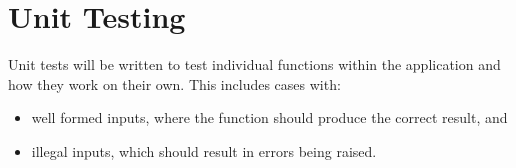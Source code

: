 \section{Unit Testing}

Unit tests will be written to test individual functions within the application and how they work on their own. This includes cases with:

\begin{itemize}
  \item well formed inputs, where the function should produce the correct result, and
  \item illegal inputs, which should result in errors being raised. 
\end{itemize}